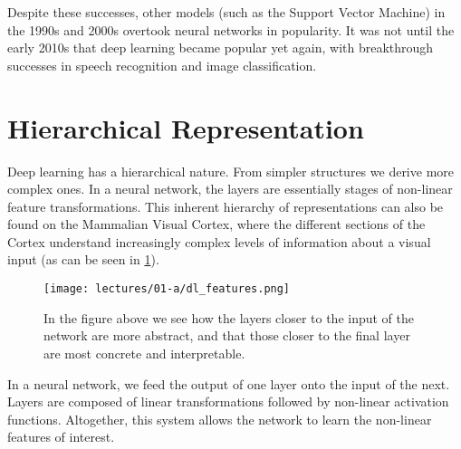 Despite these successes, other models (such as the Support Vector Machine) in the 1990s and 2000s overtook neural networks in popularity.
It was not until the early 2010s that deep learning became popular yet again, with breakthrough successes in speech recognition and image classification.

\section{Hierarchical Representation}\label{ssec:hierarchical-representation}

Deep learning has a hierarchical nature.
From simpler structures we derive more complex ones.
In a neural network, the layers are essentially stages of non-linear feature transformations.
This inherent hierarchy of representations can also be found on the Mammalian Visual Cortex, where the different sections of the Cortex understand increasingly complex levels of information about a visual input (as can be seen in \cref{fig:deep-learning-hierarchical-features}).

\begin{figure}[ht]
\centering
\texttt{[image: lectures/01-a/dl\_features.png]}
\caption{In the figure above we see how the layers closer to the input of the network are more abstract, and that those closer to the final layer are most concrete and interpretable.}
\label{fig:deep-learning-hierarchical-features}
\end{figure}

In a neural network, we feed the output of one layer onto the input of the next.
Layers are composed of linear transformations followed by non-linear activation functions.
Altogether, this system allows the network to learn the non-linear features of interest.

